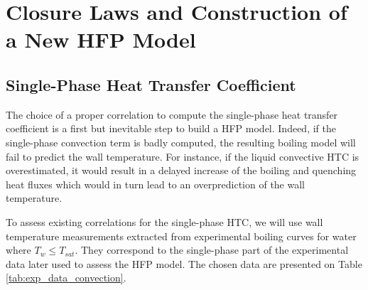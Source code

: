 
\chapter{Closure Laws and Construction of a New HFP Model} %

\label{chap:HFP_closures} %


\minitoc


\section{Single-Phase Heat Transfer Coefficient}
\label{sec:single_phase_HTC}

The choice of a proper correlation to compute the single-phase heat transfer coefficient is a first but inevitable step to build a HFP model. Indeed, if the single-phase convection term is badly computed, the resulting boiling model will fail to predict the wall temperature. For instance, if the liquid convective HTC is overestimated, it would result in a delayed increase of the boiling and quenching heat fluxes which would in turn lead to an overprediction of the wall temperature. 

\npar
To assess existing correlations for the single-phase HTC, we will use wall temperature measurements extracted from experimental boiling curves for water where $T_{w}\leq T_{sat}$. They correspond to the single-phase part of the experimental data later used to assess the HFP model. The chosen data are presented on Table \ref{tab:exp_data_convection}.

